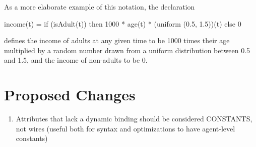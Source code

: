 \documentclass{article}
\begin{document}
As a more elaborate example of this notation, the declaration
\begin{code}
income(t) = if (isAdult(t)) 
    		   then 1000 * age(t) * (uniform (0.5, 1.5))(t)
                   else 0 
\end{code}
defines the income of adults at any given time to be 1000 times their age multiplied by a random number drawn from a uniform distribution between 0.5 and 1.5, and the income of non-adults to be 0.




\section {Proposed Changes}
\begin{enumerate}
\item Attributes that lack a dynamic binding should be considered CONSTANTS, not wires (useful both for syntax and optimizations to have agent-level constants)
\end{enumerate}



%





\end{document}
